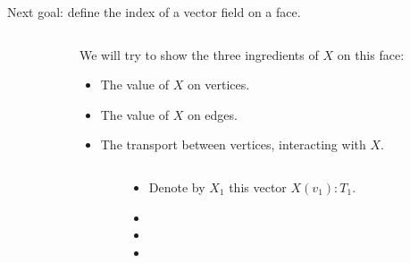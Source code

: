 \begin{frame}
Next goal: define the index of a vector field on a face.
\end{frame}

\begin{frame}
\begin{columns}
\begin{column}{0.65\textwidth}
\vspace{12pt}
\begingroup
{}

\endgroup
\end{column}
\begin{column}{0.35\textwidth}
We will try to show the \alert{three} ingredients of \( X \) on this face:
\begin{itemize}
\item The value of \( X \) on vertices.
\item The value of \( X \) on edges.
\item The transport between vertices, interacting with \( X \).
\end{itemize}
\end{column}
\end{columns}
\end{frame}

\begin{frame}
\begin{columns}
\begin{column}{0.65\textwidth}
\vspace{12pt}
\begingroup
{}

\endgroup
\end{column}
\begin{column}{0.35\textwidth}
\begin{itemize}
\item<1-> Denote by \( X_1 \) this vector \( X(v_1):T_1 \).
\item<1-> 
\item<1-> 
\item<1-> 
\end{itemize}
\end{column}
\end{columns}
\end{frame}

